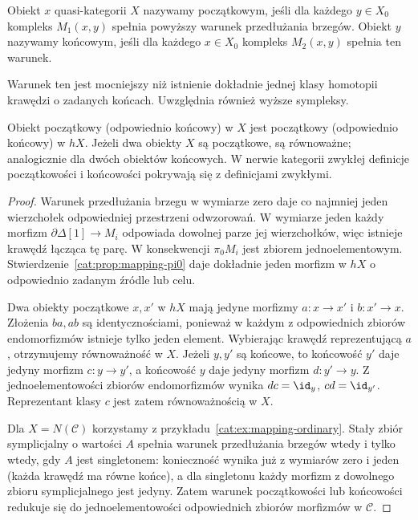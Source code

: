 \begin{definicja}\label{cat:def:quasicat-initial-terminal}
Obiekt $x$ quasi-kategorii $X$ nazywamy początkowym, jeśli dla każdego $y\in X_0$ kompleks $M_1(x,y)$ spełnia powyższy warunek przedłużania brzegów. Obiekt $y$ nazywamy końcowym, jeśli dla każdego $x\in X_0$ kompleks $M_2(x,y)$ spełnia ten warunek.
\end{definicja}
Warunek ten jest mocniejszy niż istnienie dokładnie jednej klasy homotopii krawędzi o zadanych końcach. Uwzględnia również wyższe sympleksy.

\begin{stwierdzenie}\label{cat:prop:quasicat-initial-terminal-h}
Obiekt początkowy (odpowiednio końcowy) w $X$ jest początkowy (odpowiednio końcowy) w $hX$. Jeżeli dwa obiekty $X$ są początkowe, są równoważne; analogicznie dla dwóch obiektów końcowych. W nerwie kategorii zwykłej definicje początkowości i końcowości pokrywają się z definicjami zwykłymi.
\end{stwierdzenie}
\begin{proof}
Warunek przedłużania brzegu w wymiarze zero daje co najmniej jeden wierzchołek odpowiedniej przestrzeni odwzorowań. W wymiarze jeden każdy morfizm $\partial\Delta[1]\to M_i$ odpowiada dowolnej parze jej wierzchołków, więc istnieje krawędź łącząca tę parę. W konsekwencji $\pi_0M_i$ jest zbiorem jednoelementowym. Stwierdzenie~\ref{cat:prop:mapping-pi0} daje dokładnie jeden morfizm w $hX$ o odpowiednio zadanym źródle lub celu.

Dwa obiekty początkowe $x,x'$ w $hX$ mają jedyne morfizmy $a:x\to x'$ i $b:x'\to x$. Złożenia $ba,ab$ są identycznościami, ponieważ w każdym z odpowiednich zbiorów endomorfizmów istnieje tylko jeden element. Wybierając krawędź reprezentującą $a$, otrzymujemy równoważność w $X$. Jeżeli $y,y'$ są końcowe, to końcowość $y'$ daje jedyny morfizm $c:y\to y'$, a końcowość $y$ daje jedyny morfizm $d:y'\to y$. Z jednoelementowości zbiorów endomorfizmów wynika $dc=\id_y$, $cd=\id_{y'}$. Reprezentant klasy $c$ jest zatem równoważnością w $X$.

Dla $X=N(\mathcal C)$ korzystamy z przykładu~\ref{cat:ex:mapping-ordinary}. Stały zbiór symplicjalny o wartości $A$ spełnia warunek przedłużania brzegów wtedy i tylko wtedy, gdy $A$ jest singletonem: konieczność wynika już z wymiarów zero i jeden (każda krawędź ma równe końce), a dla singletonu każdy morfizm z dowolnego zbioru symplicjalnego jest jedyny. Zatem warunek początkowości lub końcowości redukuje się do jednoelementowości odpowiednich zbiorów morfizmów w $\mathcal C$.
\end{proof}


